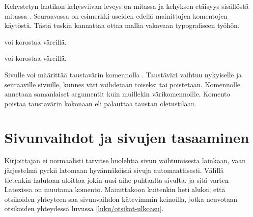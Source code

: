 \noindent
Kehystetyn laatikon kehysviivan leveys on mitassa  ja
kehyksen etäisyys sisällöstä mitassa . Seuraavassa on
esimerkki useiden edellä mainittujen komentojen käytöstä. Tästä tuskin
kannattaa ottaa mallia vakavaan typografiseen työhön.

\begin{koodilohkosis}
\setlength{\fboxrule}{2bp} \setlength{\fboxsep}{1bp}
\textcolor{pun}{voi korostaa} \colorbox{pun}{väreillä}.
\end{koodilohkosis}

\begin{tulossis}
  \setlength{\fboxrule}{2bp} \setlength{\fboxsep}{1bp}
  \textcolor{pun}{voi korostaa} \colorbox{pun}{väreillä}.
\end{tulossis}

\noindent
Sivulle voi määrittää taustavärin komennolla .
Taustäväri vaihtuu nykyiselle ja seuraaville sivuille, kunnes väri
vaihdetaan toiseksi tai poistetaan. Komennolle annetaan samanlaiset
argumentit kuin muillekin värikomennoille. Komento
 poistaa taustavärin kokonaan eli palauttaa
taustan oletustilaan.

\begin{koodilohkosis}
\pagecolor{nimi} %
\pagecolor[värimalli]{parametrit}
\nopagecolor
\end{koodilohkosis}

\section{Sivunvaihdot ja sivujen tasaaminen}
\label{luku/sivunvaihdot}

Kirjoittajan ei normaalisti tarvitse huolehtia sivun vaihtumisesta
lainkaan, vaan järjestelmä pyrkii latomaan hyvännäköisiä sivuja
automaattisesti. Välillä tietenkin halutaan aloittaa jokin uusi aihe
puhtaalta sivulta, ja sitä varten Latexissa on muutama komento.
Mainittakoon kuitenkin heti aluksi, että otsikoiden yhteyteen saa
sivunvaihdon kätevimmin keinoilla, jotka neuvotaan otsikoiden yhteydessä
luvussa \ref{luku/otsikot-ulkoasu}.

